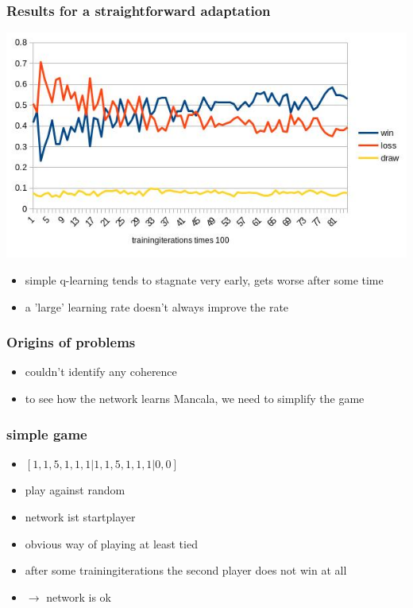 \documentclass{beamer}
\begin{document}
 \begin{frame}
\frametitle{Results for a straightforward adaptation}
\includegraphics[scale=0.65]{gewinnrate.jpg}
\begin{itemize}
\item simple q-learning tends to stagnate very early, gets worse after some time
\item a 'large' learning rate doesn't always improve the rate
\end{itemize}
\end{frame}
 
\begin{frame}
\frametitle{Origins of problems}
\begin{itemize}
\item couldn't identify any coherence
\item to see how the network learns Mancala, we need to simplify the game
\end{itemize}
\end{frame} 
 
 \begin{frame}
 \frametitle{simple game}
\begin{itemize}
\item $[1,1,5,1,1,1|1,1,5,1,1,1|0,0]$
\item play against random
\item network ist startplayer
\item obvious way of playing at least tied
\item after some trainingiterations the second player does not win at all
\item $\rightarrow$ network is ok
\end{itemize}
 \end{frame}
\end{document}

